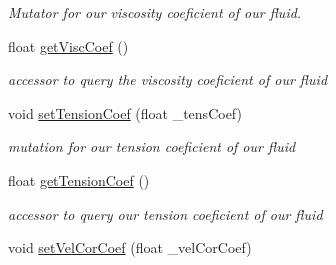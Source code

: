 \begin{DoxyCompactItemize}
\begin{DoxyCompactList}\small\item\em Mutator for our viscosity coeficient of our fluid. \end{DoxyCompactList}\item 
\hypertarget{class_s_p_h_engine_a6d3709693af1379db5b60b02171d8c8b}{float \hyperlink{class_s_p_h_engine_a6d3709693af1379db5b60b02171d8c8b}{get\-Visc\-Coef} ()}\label{class_s_p_h_engine_a6d3709693af1379db5b60b02171d8c8b}

\begin{DoxyCompactList}\small\item\em accessor to query the viscosity coeficient of our fluid \end{DoxyCompactList}\item 
\hypertarget{class_s_p_h_engine_ac1e6f83f2da1ec79a6e6a633b810daba}{void \hyperlink{class_s_p_h_engine_ac1e6f83f2da1ec79a6e6a633b810daba}{set\-Tension\-Coef} (float \-\_\-tens\-Coef)}\label{class_s_p_h_engine_ac1e6f83f2da1ec79a6e6a633b810daba}

\begin{DoxyCompactList}\small\item\em mutation for our tension coeficient of our fluid \end{DoxyCompactList}\item 
\hypertarget{class_s_p_h_engine_afa874402b050ea1f618bf2caf7f988b4}{float \hyperlink{class_s_p_h_engine_afa874402b050ea1f618bf2caf7f988b4}{get\-Tension\-Coef} ()}\label{class_s_p_h_engine_afa874402b050ea1f618bf2caf7f988b4}

\begin{DoxyCompactList}\small\item\em accessor to query our tension coeficient of our fluid \end{DoxyCompactList}\item 
\hypertarget{class_s_p_h_engine_a6b418198ceab591b1abfa5f645dbc9d7}{void \hyperlink{class_s_p_h_engine_a6b418198ceab591b1abfa5f645dbc9d7}{set\-Vel\-Cor\-Coef} (float \-\_\-vel\-Cor\-Coef)}\label{class_s_p_h_engine_a6b418198ceab591b1abfa5f645dbc9d7}


\end{DoxyCompactItemize}
